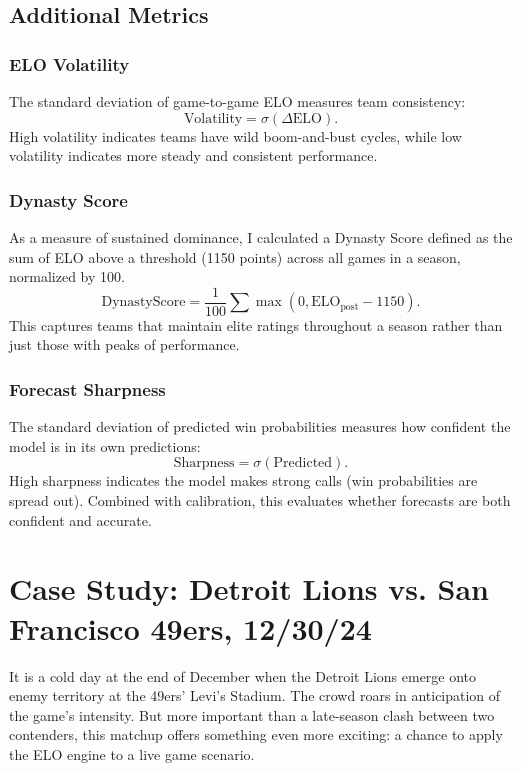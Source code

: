 \documentclass[a4paper,10.5pt,twoside]{article}
\begin{document}
\subsection{Additional Metrics}

\subsubsection{ELO Volatility}

The standard deviation of game-to-game ELO measures team consistency:
\[
\text{Volatility} = \sigma(\Delta \text{ELO}).
\]
High volatility indicates teams have wild boom-and-bust cycles, while low volatility indicates more steady and consistent performance.

\subsubsection{Dynasty Score}

As a measure of sustained dominance, I calculated a Dynasty Score defined as the sum of ELO above a threshold (1150 points) across all games in a season, normalized by 100.
\[
\text{DynastyScore} = \frac{1}{100} \sum \max(0, \text{ELO}_{\text{post}} - 1150).
\]
This captures teams that maintain elite ratings throughout a season rather than just those with peaks of performance.

\subsubsection{Forecast Sharpness}

The standard deviation of predicted win probabilities measures how confident the model is in its own predictions:
\[
\text{Sharpness} = \sigma(\text{Predicted}).
\]
High sharpness indicates the model makes strong calls (win probabilities are spread out). Combined with calibration, this evaluates whether forecasts are both confident and accurate.

\newpage

\section{Case Study: Detroit Lions vs. San Francisco 49ers, 12/30/24}

It is a cold day at the end of December when the Detroit Lions emerge onto enemy territory at the 49ers’ Levi's Stadium. The crowd roars in anticipation of the game’s intensity. But more important than a late-season clash between two contenders, this matchup offers something even more exciting: a chance to apply the ELO engine to a live game scenario.
\end{document}
